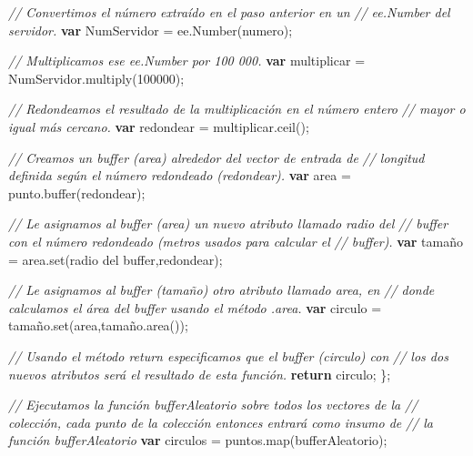 \documentclass[
  12pt,
  letterpaper,
  twoside]{book}
\newenvironment{Shaded}{\begin{snugshade}}{\end{snugshade}}
\newcommand{\CommentTok}[1]{\textcolor[rgb]{0.24,0.58,0.00}{\textit{#1}}}
\newcommand{\ControlFlowTok}[1]{\textcolor[rgb]{0.00,0.00,0.00}{\textbf{#1}}}
\newcommand{\DecValTok}[1]{\textcolor[rgb]{0.28,0.53,0.93}{#1}}
\newcommand{\FunctionTok}[1]{\textcolor[rgb]{0.48,0.12,0.64}{#1}}
\newcommand{\KeywordTok}[1]{\textcolor[rgb]{0.48,0.12,0.64}{#1}}
\newcommand{\NormalTok}[1]{#1}
\newcommand{\OperatorTok}[1]{\textcolor[rgb]{0.00,0.00,0.00}{#1}}
\newcommand{\StringTok}[1]{\textcolor[rgb]{0.87,0.29,0.22}{#1}}
\begin{document}
\begin{Shaded}
\begin{Highlighting}[]
  \CommentTok{// Convertimos el número extraído en el paso anterior en un }
  \CommentTok{// ee.Number del servidor.}
    \ControlFlowTok{var}\NormalTok{ NumServidor }\OperatorTok{=} \KeywordTok{ee}\OperatorTok{.}\FunctionTok{Number}\NormalTok{(numero)}\OperatorTok{;}   

  \CommentTok{// Multiplicamos ese ee.Number por 100 000.}
  \ControlFlowTok{var}\NormalTok{ multiplicar }\OperatorTok{=}\NormalTok{ NumServidor}\OperatorTok{.}\FunctionTok{multiply}\NormalTok{(}\DecValTok{100000}\NormalTok{)}\OperatorTok{;} 
 
  \CommentTok{// Redondeamos el resultado de la multiplicación en el número entero }
  \CommentTok{// mayor o igual más cercano.}
  \ControlFlowTok{var}\NormalTok{ redondear }\OperatorTok{=}\NormalTok{ multiplicar}\OperatorTok{.}\FunctionTok{ceil}\NormalTok{()}\OperatorTok{;} 
  
  \CommentTok{// Creamos un buffer (area) alrededor del vector de entrada de }
  \CommentTok{// longitud definida según el número redondeado (redondear).}
  \ControlFlowTok{var}\NormalTok{ area }\OperatorTok{=}\NormalTok{ punto}\OperatorTok{.}\FunctionTok{buffer}\NormalTok{(redondear)}\OperatorTok{;}

  \CommentTok{// Le asignamos al buffer (area) un nuevo atributo llamado \textquotesingle{}radio del}
  \CommentTok{// buffer\textquotesingle{} con el número redondeado (metros usados para calcular el }
  \CommentTok{// buffer).}
  \ControlFlowTok{var}\NormalTok{ tamaño }\OperatorTok{=}\NormalTok{ area}\OperatorTok{.}\FunctionTok{set}\NormalTok{(}\StringTok{\textquotesingle{}radio del buffer\textquotesingle{}}\OperatorTok{,}\NormalTok{redondear)}\OperatorTok{;}  

  \CommentTok{// Le asignamos al buffer (tamaño) otro atributo llamado \textquotesingle{}area\textquotesingle{}, en }
  \CommentTok{// donde calculamos el área del buffer usando el método .area.}
  \ControlFlowTok{var}\NormalTok{ circulo }\OperatorTok{=}\NormalTok{ tamaño}\OperatorTok{.}\FunctionTok{set}\NormalTok{(}\StringTok{\textquotesingle{}area\textquotesingle{}}\OperatorTok{,}\NormalTok{tamaño}\OperatorTok{.}\FunctionTok{area}\NormalTok{())}\OperatorTok{;}  

  \CommentTok{// Usando el método return especificamos que el buffer (circulo) con }
  \CommentTok{// los dos nuevos atributos será el resultado de esta función. }
  \ControlFlowTok{return}\NormalTok{ circulo}\OperatorTok{;}
\NormalTok{\}}\OperatorTok{;}

\CommentTok{// Ejecutamos la función \textquotesingle{}bufferAleatorio\textquotesingle{} sobre todos los vectores de la}
\CommentTok{// colección, cada punto de la colección entonces entrará como insumo de }
\CommentTok{// la función bufferAleatorio}
\ControlFlowTok{var}\NormalTok{ circulos }\OperatorTok{=}\NormalTok{ puntos}\OperatorTok{.}\FunctionTok{map}\NormalTok{(bufferAleatorio)}\OperatorTok{;} 
\end{Highlighting}
\end{Shaded}
\end{document}
